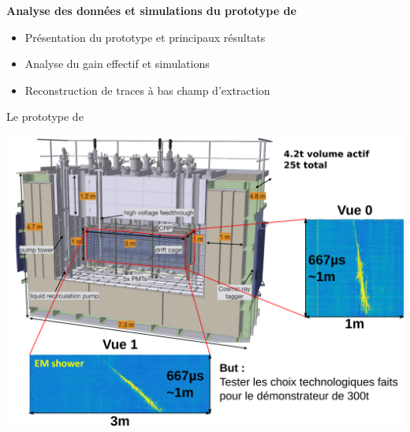    {
        \begin{specialframe}
            \vspace{2cm}\hspace*{-1.8cm}\parbox[t]{\textwidth}{
                \begin{center}
                    \begin{huge}
                            \textcolor{pheniics_purple}{\textbf{Analyse des données et simulations du prototype de \TOO{}}}
                    \end{huge}
                    \vspace{1cm}
                    \begin{itemize}
                        \item Présentation du prototype et principaux résultats
                        \item Analyse du gain effectif et simulations
                        \item Reconstruction de traces à bas champ d'extraction
                    \end{itemize}
                \end{center}
            }
        \end{specialframe}
    }
   
    \begin{frame}{Le prototype de \TOO{}}
   		\begin{scriptsize}
        	\centering
        	\includegraphics[width=\textwidth]{./pictures/311_2.png}        	
		\end{scriptsize}
   	\end{frame}
   	

